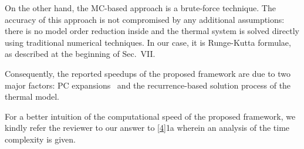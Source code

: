 \begin{authors}
On the other hand, the MC-based approach is a brute-force technique.
The accuracy of this approach is not compromised by any additional assumptions: there is no model order reduction inside and the thermal system is solved directly using traditional numerical techniques.
In our case, it is Runge-Kutta formulae, as described at the beginning of Sec.~VII.

Consequently, the reported speedups of the proposed framework are due to two major factors: PC expansions \perse\ and the recurrence-based solution process of the thermal model.

For a better intuition of the computational speed of the proposed framework, we kindly refer the reviewer to our answer to \cref{4}{1a} wherein an analysis of the time complexity is given.

\begin{actions}
\end{actions}
\end{authors}
